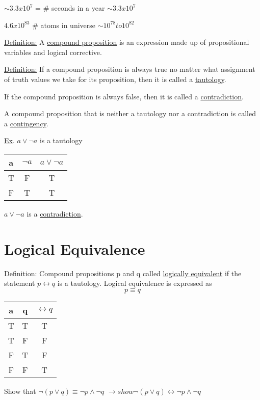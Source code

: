 \documentclass{article}
\begin{document}
$\sim3.3x10^7$ = \# seconds in a year $\sim3.3x10^7$

$4.6x10^83$ \# atoms in universe $\sim 10^78 to 10^82$


\hfill \break
\underline{Definition:} A \underline{compound proposition} is an expression made up of propositional variables and logical corrective.

\hfill \break
\underline{Definition:} If a compound proposition is always true no matter what assignment of truth values we take for its proposition, then it is called a \underline{tautology}.

\hfill \break
If the compound proposition is always false, then it is called a \underline{contradiction}.

\hfill \break
A compound proposition that is neither a tautology nor a contradiction is called a \underline{contingency}.

\hfill \break
\underline{Ex}. $a\lor \lnot a$ is a tautology
\begin{center}
\begin{tabular}{ |c|c|c| } 
 \hline
 a & $\lnot a$ & $a\lor \lnot a$ \\ 
 \hline
 T & F & T \\ 
 F & T & T \\
 \hline
\end{tabular}
\end{center}
\hfill \break
$a\lor \lnot a$ is a \underline{contradiction}.

\section{Logical Equivalence}
Definition: Compound propositions p and q called \underline{logically equivalent} if the statement $p\leftrightarrow q$ is a tautology. Logical equivalence is expressed as
\begin{displaymath}
    p\equiv q
\end{displaymath}
\begin{center}
\begin{tabular}{ |c|c|c| } 
 \hline
 a & q & $\leftrightarrow q$ \\ 
 \hline
 T & T & T \\ 
 T & F & F \\
 F & T & F \\
 F & F & T \\
 \hline
\end{tabular}
\end{center}
\hfill \break
Show that $\lnot(p\lor q)\equiv \lnot p\land \lnot q$
$\rightarrow show \lnot(p\lor q)\leftrightarrow \lnot p\land \lnot q$
\end{document}
